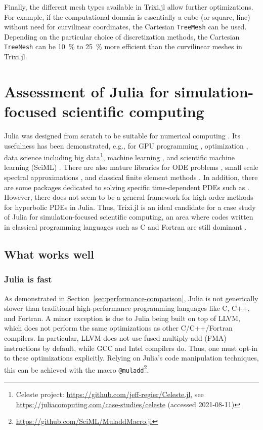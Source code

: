 \documentclass[hidelinks]{juliacon} %
\makeatletter
\newcommand{\eg}[0]{{e.g.\@}\xspace}
\newcommand{\trixi}{Trixi.jl\xspace}
\makeatother
\begin{document}
Finally, the different mesh types available in \trixi allow further optimizations.
For example, if the computational domain is essentially a cube (or square, line)
without need for curvilinear coordinates, the Cartesian \lstinline{TreeMesh} can
be used. Depending on the particular choice of discretization methods, the
Cartesian \lstinline{TreeMesh} can be \SI{10}{\percent} to \SI{25}{\percent}
more efficient than the curvilinear meshes in \trixi.

\section{Assessment of Julia for simulation-focused scientific computing}
\label{sec:assessment-of-julia}

Julia was designed from scratch to be suitable for numerical computing
\cite{bezanson2017julia}. Its usefulness has been demonstrated, \eg, for
GPU programming \cite{besard2018juliagpu, omlin2020solving},
optimization \cite{dunning2017jump}, data science including
big data\footnote{Celeste project: \url{https://github.com/jeff-regier/Celeste.jl},
see \url{https://juliacomputing.com/case-studies/celeste} (accessed 2021-08-11)},
machine learning \cite{innes2018fashionable}, and scientific machine learning
(SciML) \cite{pal2021opening}. There are also mature libraries for ODE problems
\cite{rackauckas2017differentialequations}, small scale spectral approximations
\cite{olver2014practical}, and classical finite element methods \cite{badia2020gridap}.
In addition, there are some packages dedicated to solving specific time-dependent
PDEs such as \cite{ramadhan2020oceananigans, constantinou2021geophysicalflows}.
However, there does not seem to be a general framework for high-order methods
for hyperbolic PDEs in Julia. Thus, \trixi is an ideal candidate for a case study
of Julia for simulation-focused scientific computing, an area where codes written
in classical programming languages such as C and Fortran are still dominant
\cite{krais2021flexi, parsani2021ssdc}.

\subsection{What works well}

\subsubsection{Julia is fast}

As demonstrated in Section~\ref{sec:performance-comparison},
Julia is not generically slower than traditional high-performance programming
languages like C, C++, and Fortran. A minor exception is due to
Julia being built on top of LLVM, which does not perform the same optimizations as other
C/C++/Fortran compilers. In particular, LLVM does
not use fused multiply-add (FMA) instructions by default, while GCC and Intel
compilers do. Thus, one must opt-in to these optimizations explicitly.
Relying on Julia's code manipulation techniques, this can be achieved with the macro
\lstinline{@muladd}\footnote{\url{https://github.com/SciML/MuladdMacro.jl}}.
\end{document}
